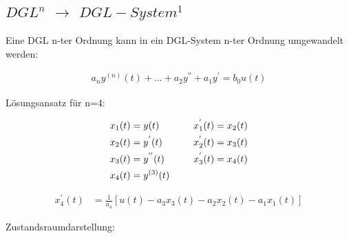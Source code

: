 \documentclass[10pt,a4paper]{article}
\begin{document}
\subsection{$DGL^n$ $\rightarrow$ $DGL-System^1$}
Eine DGL n-ter Ordnung kann in ein DGL-System n-ter Ordnung umgewandelt werden:
  \begin{mdframed}[style=exercise]
    \begin{align}
        a_n y^{(n)}(t) + ... + a_2 y^{''} + a_1 y^{'} = b_0u(t)
    \end{align}
  \end{mdframed}
Lösungsansatz für n=4: 
  \begin{mdframed}[style=exercise]
    \begin{align}
        x_1(t) &= y(t) & \indent      x_1^{'}(t) &= x_2(t)\\
        x_2(t) &= y^{'}(t) &\indent   x_2^{'}(t) &= x_3(t)\\
        x_3(t) &= y^{''}(t) &\indent  x_3^{'}(t) &= x_4(t)\\
        x_4(t) &= y^{(3)}(t) &\indent 
    \end{align}
  \end{mdframed}
  \begin{mdframed}[style=exercise]
    \begin{align}
        x_4^{'}(t) &= \frac{1}{a_4}[u(t)-a_3x_3(t)-a_2x_2(t)-a_1x_1(t)]
    \end{align}
  \end{mdframed}
Zustandsraumdarstellung:
\end{document}
